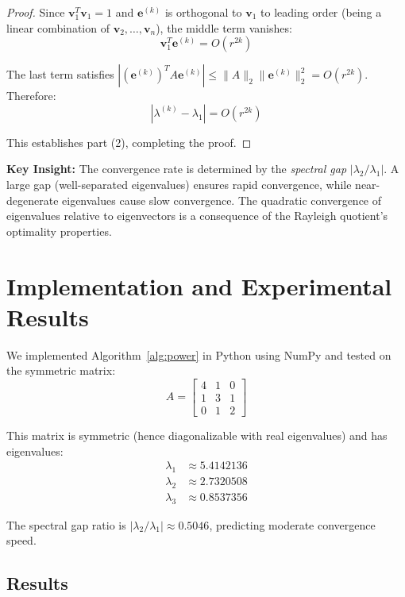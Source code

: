 \documentclass[11pt,a4paper]{article}
\begin{document}
\begin{proof}
Since $\mathbf{v}_1^T \mathbf{v}_1 = 1$ and $\mathbf{e}^{(k)}$ is orthogonal to $\mathbf{v}_1$ to leading order (being a linear combination of $\mathbf{v}_2, \ldots, \mathbf{v}_n$), the middle term vanishes:
\begin{equation}
\mathbf{v}_1^T \mathbf{e}^{(k)} = O(r^{2k})
\end{equation}

The last term satisfies $|(\mathbf{e}^{(k)})^T A \mathbf{e}^{(k)}| \leq \|A\|_2 \|\mathbf{e}^{(k)}\|_2^2 = O(r^{2k})$. Therefore:
\begin{equation}
|\lambda^{(k)} - \lambda_1| = O(r^{2k})
\end{equation}

This establishes part (2), completing the proof.
\end{proof}

\textbf{Key Insight:} The convergence rate is determined by the \emph{spectral gap} $|\lambda_2/\lambda_1|$. A large gap (well-separated eigenvalues) ensures rapid convergence, while near-degenerate eigenvalues cause slow convergence. The quadratic convergence of eigenvalues relative to eigenvectors is a consequence of the Rayleigh quotient's optimality properties.

\section{Implementation and Experimental Results}

We implemented Algorithm~\ref{alg:power} in Python using NumPy and tested on the symmetric matrix:
\begin{equation}
A = \begin{bmatrix} 4 & 1 & 0 \\ 1 & 3 & 1 \\ 0 & 1 & 2 \end{bmatrix}
\end{equation}

This matrix is symmetric (hence diagonalizable with real eigenvalues) and has eigenvalues:
\begin{align*}
\lambda_1 &\approx 5.4142136 \\
\lambda_2 &\approx 2.7320508 \\
\lambda_3 &\approx 0.8537356
\end{align*}

The spectral gap ratio is $|\lambda_2/\lambda_1| \approx 0.5046$, predicting moderate convergence speed.

\subsection{Results}
\end{document}
